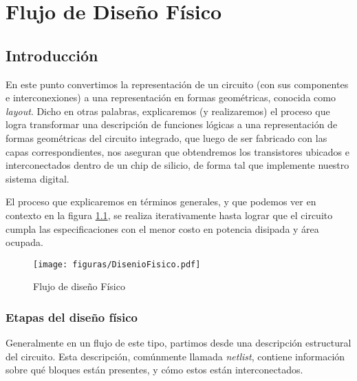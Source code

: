 \chapter{Flujo de Diseño Físico}
\section{Introducción}

En este punto convertimos la representación de un circuito (con sus componentes e interconexiones) a una representación en formas geométricas, conocida como \emph{layout}. Dicho en otras palabras, explicaremos (y realizaremos) el proceso que logra transformar una descripción de funciones lógicas a una representación de formas geométricas del circuito integrado, que luego de ser fabricado con las capas correspondientes, nos aseguran que obtendremos los transistores ubicados e interconectados dentro de un chip de silicio, de forma tal que implemente nuestro sistema digital.

El proceso que explicaremos en términos generales, y que podemos ver en contexto en la figura \ref{fig:diseñoFísico}, se realiza iterativamente hasta lograr que el circuito cumpla las especificaciones con el menor costo en potencia disipada y área ocupada.

\begin{figure}[h]
\centering
\texttt{[image: figuras/DisenioFisico.pdf]}
  \caption{Flujo de diseño Físico}
  \label{fig:diseñoFísico}
\end{figure}

\subsection{Etapas del diseño físico}\label{etapasDiseñoFisico}
Generalmente en un flujo de este tipo, partimos desde una descripción estructural del circuito. Esta descripción, comúnmente llamada \emph{netlist}, contiene información sobre qué bloques están presentes, y cómo estos están interconectados.



